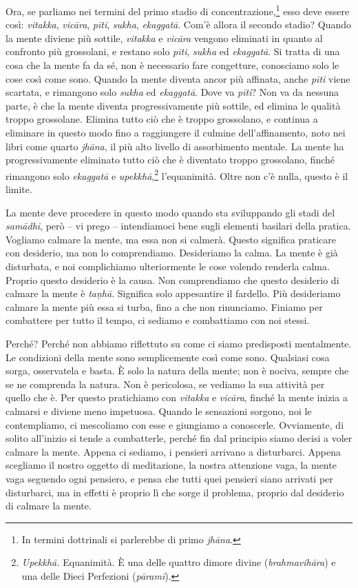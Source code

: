 Ora, se parliamo nei termini del primo stadio di
concentrazione,\footnote{In termini dottrinali si parlerebbe di primo
  \emph{jhāna}.} esso deve essere così: \emph{vitakka}, \emph{vicāra},
\emph{pīti}, \emph{sukha}, \emph{ekaggatā}. Com'è allora il secondo
stadio? Quando la mente diviene più sottile, \emph{vitakka} e
\emph{vicāra} vengono eliminati in quanto al confronto più grossolani, e
restano solo \emph{pīti}, \emph{sukha} ed \emph{ekaggatā}. Si tratta di
una cosa che la mente fa da sé, non è necessario fare congetture,
conosciamo solo le cose così come sono. Quando la mente diventa ancor
più affinata, anche \emph{pīti} viene scartata, e rimangono solo
\emph{sukha} ed \emph{ekaggatā}. Dove va \emph{pīti}? Non va da nessuna
parte, è che la mente diventa progressivamente più sottile, ed elimina
le qualità troppo grossolane. Elimina tutto ciò che è troppo grossolano,
e continua a eliminare in questo modo fino a raggiungere il culmine
dell'affinamento, noto nei libri come quarto \emph{jhāna}, il più alto
livello di assorbimento mentale. La mente ha progressivamente eliminato
tutto ciò che è diventato troppo grossolano, finché rimangono solo
\emph{ekaggatā} e \emph{upekkhā},\footnote{\emph{Upekkhā.} Equanimità. È
  una delle quattro dimore divine (\emph{brahmavihāra}) e una delle
  Dieci Perfezioni (\emph{pāramī}).} l'equanimità. Oltre non c'è nulla,
questo è il limite.

La mente deve procedere in questo modo quando sta sviluppando gli stadi
del \emph{samādhi}, però -- vi prego -- intendiamoci bene sugli elementi
basilari della pratica. Vogliamo calmare la mente, ma essa non si
calmerà. Questo significa praticare con desiderio, ma non lo
comprendiamo. Desideriamo la calma. La mente è già disturbata, e noi
complichiamo ulteriormente le cose volendo renderla calma. Proprio
questo desiderio è la causa. Non comprendiamo che questo desiderio di
calmare la mente è \emph{taṇhā}. Significa solo appesantire il fardello.
Più desideriamo calmare la mente più essa si turba, fino a che non
rinunciamo. Finiamo per combattere per tutto il tempo, ci sediamo e
combattiamo con noi stessi.

Perché? Perché non abbiamo riflettuto su come ci siamo predisposti
mentalmente. Le condizioni della mente sono semplicemente così come
sono. Qualsiasi cosa sorga, osservatela e basta. È solo la natura della
mente; non è nociva, sempre che se ne comprenda la natura. Non è
pericolosa, se vediamo la sua attività per quello che è. Per questo
pratichiamo con \emph{vitakka} e \emph{vicāra}, finché la mente inizia a
calmarsi e diviene meno impetuosa. Quando le sensazioni sorgono, noi le
contempliamo, ci mescoliamo con esse e giungiamo a conoscerle.
Ovviamente, di solito all'inizio si tende a combatterle, perché fin dal
principio siamo decisi a voler calmare la mente. Appena ci sediamo, i
pensieri arrivano a disturbarci. Appena scegliamo il nostro oggetto di
meditazione, la nostra attenzione vaga, la mente vaga seguendo ogni
pensiero, e pensa che tutti quei pensieri siano arrivati per
disturbarci, ma in effetti è proprio lì che sorge il problema, proprio
dal desiderio di calmare la mente.


